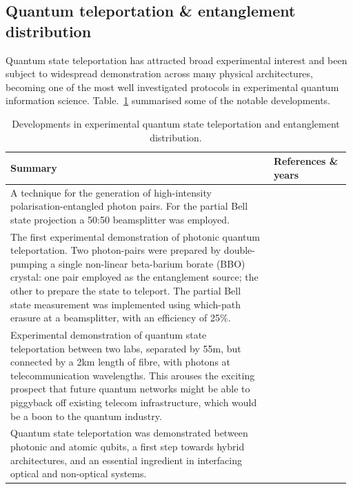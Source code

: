 \documentclass[aps,rmp,twocolumn,amsmath,amssymb,nofootinbib,superscriptaddress,longbibliography,floatfix,table-of-contents,eqsecnum]{revtex4-1}
\begin{document}
%
%

\subsection{Quantum teleportation \& entanglement distribution}   

Quantum state teleportation has attracted broad experimental interest and been subject to widespread demonstration across many physical architectures, becoming one of the most well investigated protocols in experimental quantum information science. Table.~\ref{tab:state_tomo} summarised some of the notable developments.

\begin{table}[!htb]
\caption{Developments in experimental quantum state teleportation and entanglement distribution.} \label{tab:state_tomo}
\begin{tabular}{|p{0.755\linewidth}|p{0.22\linewidth}|}
	\hline
	Summary & References \& years \\
	\hline \hline
	A technique for the generation of high-intensity polarisation-entangled photon pairs. For the partial Bell state projection a 50:50 beamsplitter was employed. & \cite{kwiat1995new, bib:Euro_25_559} \\
	\hline
	The first experimental demonstration of photonic quantum teleportation. Two photon-pairs were prepared by double-pumping a single non-linear beta-barium borate (BBO) crystal: one pair employed as the entanglement source; the other to prepare the state to teleport. The partial Bell state measurement was implemented using which-path erasure at a beamsplitter, with an efficiency of 25\%. & \cite{bib:Boumeester97} \\
	\hline
	Experimental demonstration of quantum state teleportation between two labs, separated by 55m, but connected by a 2km length of fibre, with photons at telecommunication wavelengths. This arouses the exciting prospect that future quantum networks might be able to piggyback off existing telecom infrastructure, which would be a boon to the quantum industry. & \cite{bib:Nat_421_509} \\
	\hline
	Quantum state teleportation was demonstrated between photonic and atomic qubits, a first step towards hybrid architectures, and an essential ingredient in interfacing optical and non-optical systems. & \cite{bib:Chen08} \\

\end{tabular}
\end{table}
\end{document}
